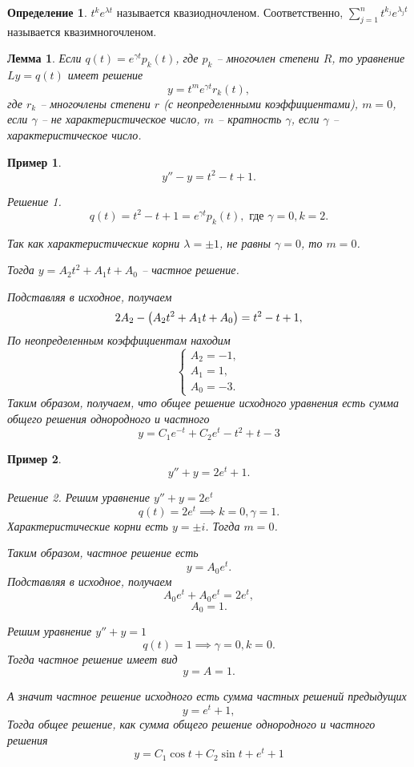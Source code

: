 \documentclass[a5paper, 11pt]{article}
\theoremstyle{definition}
\newtheorem{Def}{Определение}
\theoremstyle{plain}
\newtheorem{Lem}{Лемма}
\newtheorem{Ex}{Пример}
\theoremstyle{remark}
\newtheorem*{Solution}{Решение}
\begin{document}
	\begin{Def}
		$t^{k} e^{\lambda t}$ называется квазиодночленом. Соответственно, $\sum\limits_{j=1}^n t^{k_j} e^{\lambda_j t}$ называется квазимногочленом.
	\end{Def}

	\begin{Lem}
		Если $q(t) = e^{\gamma t} p_k(t)$, где $p_k$ -- многочлен степени $R$, то уравнение $Ly=q(t)$ имеет решение 
		\[
		y = t^m e^{\gamma t}r_k(t),
		\] 
		где $r_k$ -- многочлены степени $r$ (с неопределенными коэффициентами), $m=0$, если $\gamma$ -- не характеристическое число, $m$ -- кратность $\gamma$, если $\gamma$ -- характеристическое число.
	\end{Lem}

	\begin{Ex}
		\[
		y''-y = t^2-t+1.
		\]
		\begin{Solution}
			\[
			q(t) = t^2 - t+ 1 = e^{\gamma t } p_k(t), \text{ где $\gamma = 0, k=2$}.
			\]
			
			Так как характеристические корни $\lambda = \pm 1$, не равны $\gamma=0$, то $m=0$.
			
			Тогда $y = A_2 t^2 + A_1 t + A_0$ -- частное решение.
			
			Подставляя в исходное, получаем 
			\[
			2A_2 - \left(A_2 t^2 + A_1 t + A_0\right) = t^2-t+1,
			\]
			По неопределенным коэффициентам находим
			\[
			\begin{cases}
				A_2 = -1,\\
				A_1 = 1,\\
				A_0 = -3.
			\end{cases}
			\]
			Таким образом, получаем, что общее решение исходного уравнения есть сумма общего решения однородного и частного
			\[
			y = C_1 e^{-t} + C_2 e^t -t^2 + t - 3 
			\]
		\end{Solution}
	\end{Ex}

	\begin{Ex}
		\[
		y'' + y = 2e^t + 1.
		\]
		\begin{Solution}
			Решим уравнение $y'' + y = 2e^t$
			\[
			q(t) = 2e^t \implies k=0, \gamma=1.
			\]
			Характеристические корни есть $y=\pm i$. Тогда $m=0$.
			
			Таким образом, частное решение есть
			\[
			y = A_0 e^t. 
			\]
			Подставляя в исходное, получаем
			\[
			A_0 e^t + A_0 e^t = 2e^t,
			\]
			\[
			A_0 = 1.
			\]
			
			Решим уравнение $y'' + y = 1$
			\[
			q(t) = 1 \implies \gamma = 0, k = 0.
			\]
			Тогда частное решение имеет вид 
			\[
			y = A = 1.
			\]
			
			А значит частное решение исходного есть сумма частных решений предыдущих
			\[
			y = e^t+1,
			\]
			Тогда общее решение, как сумма общего решение однородного и частного решения
			\[
			y = C_1 \cos t + C_2 \sin t + e^t + 1
			\]
		\end{Solution}
	\end{Ex}
\end{document}
